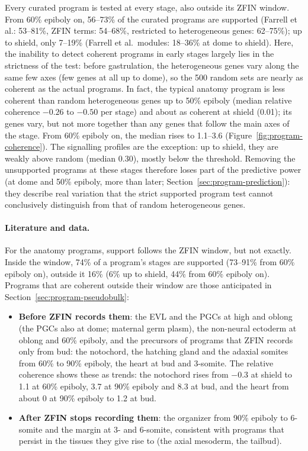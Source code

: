 \documentclass[11pt,a4paper]{article}
\begin{document}
Every curated program is tested at every stage, also outside its ZFIN window. From 60\% epiboly on, 56--73\% of the curated programs are supported (Farrell et al.: 53--81\%, ZFIN terms: 54--68\%, restricted to heterogeneous genes: 62--75\%); up to shield, only 7--19\% (Farrell et al.\ modules: 18--36\% at dome to shield). Here, the inability to detect coherent programs in early stages largely lies in the strictness of the test: before gastrulation, the heterogeneous genes vary along the same few axes (few genes at all up to dome), so the 500 random sets are nearly as coherent as the actual programs. In fact, the typical anatomy program is less coherent than random heterogeneous genes up to 50\% epiboly (median relative coherence $-0.26$ to $-0.50$ per stage) and about as coherent at shield (0.01); its genes vary, but not more together than any genes that follow the main axes of the stage. From 60\% epiboly on, the median rises to 1.1--3.6 (Figure~\ref{fig:program-coherence}). The signalling profiles are the exception: up to shield, they are weakly above random (median 0.30), mostly below the threshold. Removing the unsupported programs at these stages therefore loses part of the predictive power (at dome and 50\% epiboly, more than later; Section~\ref{sec:program-prediction}): they describe real variation that the strict supported program test cannot conclusively distinguish from that of random heterogeneous genes.

\paragraph{Literature and data.} For the anatomy programs, support follows the ZFIN window, but not exactly. Inside the window, 74\% of a program's stages are supported (73--91\% from 60\% epiboly on), outside it 16\% (6\% up to shield, 44\% from 60\% epiboly on). Programs that are coherent outside their window are those anticipated in Section~\ref{sec:program-pseudobulk}:
\begin{itemize}
	\item \textbf{Before ZFIN records them}: the EVL and the PGCs at high and oblong (the PGCs also at dome; maternal germ plasm), the non-neural ectoderm at oblong and 60\% epiboly, and the precursors of programs that ZFIN records only from bud: the notochord, the hatching gland and the adaxial somites from 60\% to 90\% epiboly, the heart at bud and 3-somite. The relative coherence shows these as trends: the notochord rises from $-0.3$ at shield to 1.1 at 60\% epiboly, 3.7 at 90\% epiboly and 8.3 at bud, and the heart from about 0 at 90\% epiboly to 1.2 at bud.
	\item \textbf{After ZFIN stops recording them}: the organizer from 90\% epiboly to 6-somite and the margin at 3- and 6-somite, consistent with programs that persist in the tissues they give rise to (the axial mesoderm, the tailbud).
\end{itemize}
\end{document}
